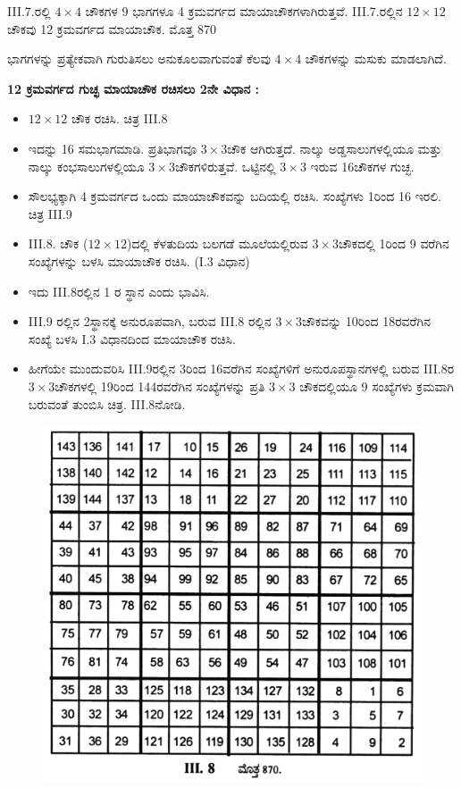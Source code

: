 III.7.ರಲ್ಲಿ $4 \times 4$ ಚೌಕಗಳ 9 ಭಾಗಗಳೂ 4 ಕ್ರಮವರ್ಗದ ಮಾಯಾಚೌಕ\-ಗಳಾಗಿರುತ್ತವೆ.  III.7.ರಲ್ಲಿನ $12 \times 12$ ಚೌಕವು 12 ಕ್ರಮವರ್ಗದ ಮಾಯಾಚೌಕ. ಮೊತ್ತ 870

 ಭಾಗಗಳನ್ನು ಪ್ರತ್ಯೇಕವಾಗಿ ಗುರುತಿಸಲು ಅನುಕೂಲವಾಗುವಂತೆ ಕೆಲವು $4 \times 4$ ಚೌಕಗಳನ್ನು ಮಸುಕು ಮಾಡಲಾಗಿದೆ.

\medskip
\noindent \textbf{12 ಕ್ರಮವರ್ಗದ ಗುಚ್ಛ ಮಾಯಾಚೌಕ ರಚಿಸಲು 2ನೇ ವಿಧಾನ :}

\begin{itemize}
	\item $12 \times 12$ ಚೌಕ ರಚಿಸಿ. ಚಿತ್ರ  III.8
	\item ಇದನ್ನು 16 ಸಮಭಾಗಮಾಡಿ. ಪ್ರತಿಭಾಗವೂ $3 \times 3$ಚೌಕ ಆಗಿರುತ್ತದೆ. ನಾಲ್ಕು ಅಡ್ಡಸಾಲುಗಳಲ್ಲಿಯೂ ಮತ್ತು ನಾಲ್ಕು ಕಂಭಸಾಲುಗಳಲ್ಲಿಯೂ $3 \times 3$ಚೌಕಗಳಿರುತ್ತವೆ. ಒಟ್ಟಿನಲ್ಲಿ $3 \times 3$ ಇರುವ 16ಚೌಕಗಳ ಗುಚ್ಛ.
	\item ಸೌಲಭ್ಯಕ್ಕಾಗಿ 4 ಕ್ರಮವರ್ಗದ ಒಂದು ಮಾಯಾಚೌಕವನ್ನು ಬದಿಯಲ್ಲಿ ರಚಿಸಿ. ಸಂಖ್ಯೆಗಳು 1ರಿಂದ 16 ಇರಲಿ. ಚಿತ್ರ  III.9
	\item III.8. ಚೌಕ ($12 \times 12$)ದಲ್ಲಿ ಕೆಳತುದಿಯ ಬಲಗಡೆ ಮೂಲೆಯಲ್ಲಿರುವ $3 \times 3$ಚೌಕದಲ್ಲಿ 1ರಿಂದ 9 ವರೆಗಿನ ಸಂಖ್ಯೆಗಳನ್ನು ಬಳಸಿ ಮಾಯಾಚೌಕ ರಚಿಸಿ. (I.3 ವಿಧಾನ)
	\item ಇದು  III.8ರಲ್ಲಿನ 1 ರ ಸ್ಥಾನ ಎಂದು ಭಾವಿಸಿ.
	\item  III.9 ರಲ್ಲಿನ 2ಸ್ಥಾನಕ್ಕೆ ಅನುರೂಪವಾಗಿ, ಬರುವ  III.8 ರಲ್ಲಿನ $3 \times 3$ಚೌಕವನ್ನು 10ರಿಂದ 18ರವರೆಗಿನ ಸಂಖ್ಯೆ ಬಳಸಿ I.3 ವಿಧಾನದಿಂದ ಮಾಯಾಚೌಕ ರಚಿಸಿ.

	\item ಹೀಗೆಯೇ ಮುಂದುವರಿಸಿ  III.9ರಲ್ಲಿನ 3ರಿಂದ 16ವರೆಗಿನ ಸಂಖ್ಯೆಗಳಿಗೆ ಅನುರೂಪಸ್ಥಾನಗಳಲ್ಲಿ ಬರುವ  III.8ರ $3 \times 3$ಚೌಕಗಳಲ್ಲಿ 19ರಿಂದ 144ರವರೆಗಿನ ಸಂಖ್ಯೆಗಳನ್ನು ಪ್ರತಿ $3 \times 3$ ಚೌಕದಲ್ಲಿಯೂ 9 ಸಂಖ್ಯೆಗಳು ಕ್ರಮವಾಗಿ ಬರುವಂತೆ ತುಂಬಿಸಿ ಚಿತ್ರ. III.8ನೋಡಿ.
\end{itemize}
\eject

	\begin{figure}[H]
	\includegraphics[scale=1.2]{src/figures/chap3/fig3-35.jpg}
	\end{figure}

